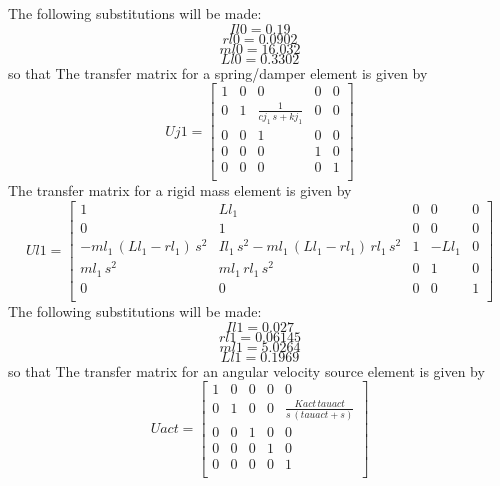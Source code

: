 \documentclass[12pt]{article}
\begin{document}
The following substitutions will be made:
\begin{equation}
	Il0=0.19
\end{equation}
\begin{equation}
	rl0=0.0902
\end{equation}
\begin{equation}
	ml0=16.032
\end{equation}
\begin{equation}
	Ll0=0.3302
\end{equation}
so that
The transfer matrix for a spring/damper element is given by
\begin{equation}
Uj1= \left[ \begin{array}{ccccc}1&0&0&0&0\\ 0&1& \displaystyle \frac{1}{cj_1\,s+kj_1}&0&0\\ 0&0&1&0&0 \\ 0&0&0&1&0\\ 0&0&0&0&1\\ \end{array} \right] 
\end{equation}
The transfer matrix for a rigid mass element is given by
\begin{equation}
Ul1= \left[ \begin{array}{ccccc}1&Ll_1&0&0&0\\ 0&1&0&0&0\\ -ml_1\,\left(Ll_1-rl_1\right) \,s^2&Il_1\,s^2-ml_1\,\left(Ll_1-rl_1\right)\,rl_1\,s^2&1&-Ll_1&0 \\ ml_1\,s^2&ml_1\,rl_1\,s^2&0&1&0\\ 0&0&0&0&1\\ \end{array} \right] 
\end{equation}
The following substitutions will be made:
\begin{equation}
	Il1=0.027
\end{equation}
\begin{equation}
	rl1=0.06145
\end{equation}
\begin{equation}
	ml1=5.0264
\end{equation}
\begin{equation}
	Ll1=0.1969
\end{equation}
so that
The transfer matrix for an angular velocity source element is given by
\begin{equation}
Uact= \left[ \begin{array}{ccccc}1&0&0&0&0\\ 0&1&0&0& \displaystyle \frac{Kact\,tauact}{s\,\left(tauact+ s\right)}\\ 0&0&1&0&0\\ 0&0&0&1&0\\ 0&0&0&0&1\\ \end{array} \right] 
\end{equation}
\end{document}
